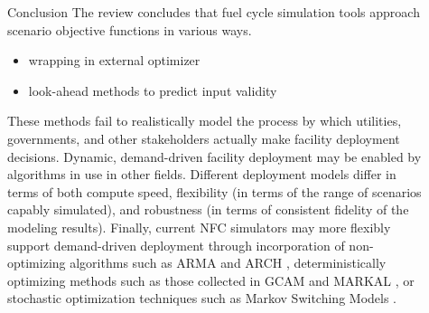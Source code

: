 \documentclass[final]{beamer}
\newlength{\sepwid}
\newlength{\onecolwid}
\newlength{\twocolwid}
\begin{document}
\begin{frame}[t]
\begin{columns}[t]
\begin{column}{\twocolwid}
\begin{columns}[t,totalwidth=\twocolwid]
\begin{column}{\onecolwid}

\end{column} %

\end{columns} %

\end{column} %

\begin{column}{\sepwid}\end{column} %

\begin{column}{\onecolwid} %


\begin{block}{Conclusion}
The review concludes that fuel cycle simulation tools approach scenario objective 
functions in various ways.
\begin{itemize}
	\item wrapping in external optimizer
	\item look-ahead methods to predict input validity
\end{itemize} 
These methods fail to realistically model the process by which utilities, governments,
and other stakeholders actually make facility deployment decisions.
Dynamic, demand-driven facility deployment may be enabled by algorithms in use in
other fields. Different deployment models differ in terms of both compute
speed, flexibility (in terms of the range of scenarios capably
simulated), and robustness (in terms of consistent fidelity of the modeling results).
Finally, current NFC simulators may more flexibly support demand-driven deployment
through incorporation of non-optimizing algorithms such as ARMA \cite{woodard_stationarity_2011} and ARCH \cite{li_kernal_2016},
deterministically optimizing methods such as those collected in GCAM \cite{edmonds_advanced_1994} and
MARKAL \cite{fishbone_markal_1981}, or stochastic optimization techniques such as Markov Switching Models \cite{ansari_predicting_2015}.
\end{block}



\end{column}
\end{columns}
\end{frame}
\end{document}
